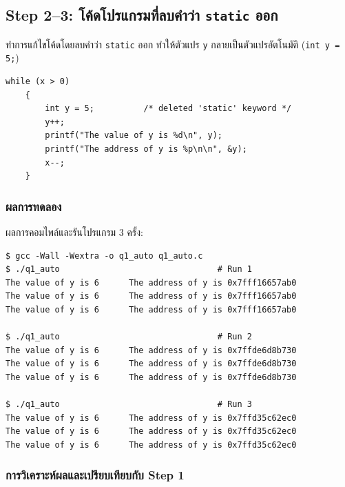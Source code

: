 \documentclass[a4paper,11pt]{article}
\newcommand{\code}[1]{\texttt{#1}}
\begin{document}
\subsection{Step 2--3: โค้ดโปรแกรมที่ลบคำว่า \code{static} ออก}

ทำการแก้ไขโค้ดโดยลบคำว่า \code{static} ออก ทำให้ตัวแปร \code{y} กลายเป็นตัวแปรอัตโนมัติ (\code{int y = 5;})

\begin{lstlisting}[style=cstyle,caption={\code{src/q1\_auto.c} ส่วนที่มีการปรับปรุง}]
    while (x > 0)
    {
        int y = 5;          /* deleted 'static' keyword */
        y++;
        printf("The value of y is %d\n", y);
        printf("The address of y is %p\n\n", &y);
        x--;
    }
\end{lstlisting}

\subsubsection{ผลการทดลอง}

ผลการคอมไพล์และรันโปรแกรม 3 ครั้ง:

\begin{lstlisting}[style=terminal,caption={ผลการทดลอง Step 2--3 (รัน 3 ครั้ง)}]
$ gcc -Wall -Wextra -o q1_auto q1_auto.c
$ ./q1_auto                                # Run 1
The value of y is 6      The address of y is 0x7fff16657ab0
The value of y is 6      The address of y is 0x7fff16657ab0
The value of y is 6      The address of y is 0x7fff16657ab0

$ ./q1_auto                                # Run 2
The value of y is 6      The address of y is 0x7ffde6d8b730
The value of y is 6      The address of y is 0x7ffde6d8b730
The value of y is 6      The address of y is 0x7ffde6d8b730

$ ./q1_auto                                # Run 3
The value of y is 6      The address of y is 0x7ffd35c62ec0
The value of y is 6      The address of y is 0x7ffd35c62ec0
The value of y is 6      The address of y is 0x7ffd35c62ec0
\end{lstlisting}

\subsubsection{การวิเคราะห์ผลและเปรียบเทียบกับ Step 1}
\end{document}
